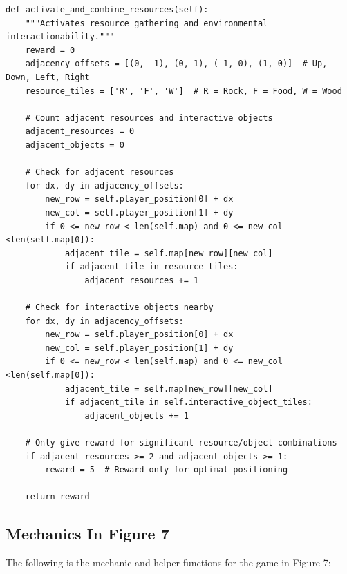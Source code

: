 \documentclass{article} %
\begin{document}
\begin{lstlisting}
def activate_and_combine_resources(self):
    """Activates resource gathering and environmental interactionability."""
    reward = 0
    adjacency_offsets = [(0, -1), (0, 1), (-1, 0), (1, 0)]  # Up, Down, Left, Right
    resource_tiles = ['R', 'F', 'W']  # R = Rock, F = Food, W = Wood
    
    # Count adjacent resources and interactive objects
    adjacent_resources = 0
    adjacent_objects = 0
    
    # Check for adjacent resources
    for dx, dy in adjacency_offsets:
        new_row = self.player_position[0] + dx
        new_col = self.player_position[1] + dy
        if 0 <= new_row < len(self.map) and 0 <= new_col <len(self.map[0]):
            adjacent_tile = self.map[new_row][new_col]
            if adjacent_tile in resource_tiles:
                adjacent_resources += 1
                    
    # Check for interactive objects nearby
    for dx, dy in adjacency_offsets:
        new_row = self.player_position[0] + dx
        new_col = self.player_position[1] + dy
        if 0 <= new_row < len(self.map) and 0 <= new_col <len(self.map[0]):
            adjacent_tile = self.map[new_row][new_col]
            if adjacent_tile in self.interactive_object_tiles:
                adjacent_objects += 1
                
    # Only give reward for significant resource/object combinations
    if adjacent_resources >= 2 and adjacent_objects >= 1:
        reward = 5  # Reward only for optimal positioning
                
    return reward
\end{lstlisting}

\subsection{Mechanics In Figure 7}

The following is the mechanic and helper functions for the game in Figure 7:
\end{document}
